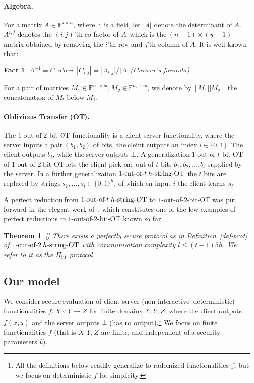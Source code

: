 \documentclass[a4paper]{article}
\newtheorem{theorem}{Theorem}[section]
\newtheorem{fact}{Fact}
\newcommand{\OT}[2]{#1\text{-out-of-}#2\text{-bit-OT}}
\newcommand{\sOT}[3]{#1\text{-out-of-}#2\text{\;$#3$-string-OT}}
\newcommand{\F}{\mathbb{F}}
\newcommand{\INT}{\Pi_{\text{int}}}
\begin{document}
\paragraph{Algebra.}

For a matrix $A\in \F^{n\times n}$, where $\F$ is a field, let
$|A|$ denote the determinant of $A$. $A^{i,j}$ denotes the $(i,j)$'th co factor of $A$, which is the $(n-1)\times(n-1)$ matrix obtained by removing the $i$'th row and $j$'th column of $A$.
It is well known that:
\begin{fact}\label{fact-cramer}
	$A^{-1}=C$ where $|C_{i,j}|=|A_{i,j}|/|A|$
	(Cramer's formula).
\end{fact}
For a pair of matrices $M_1\in \F^{n_1\times m},M_2\in \F^{n_2\times m}$, we denote by $[M_1||M_2]$ the concatenation of $M_2$ below $M_1$.

\paragraph{Oblivious Transfer (OT).}


The $\OT{1}{2}$ functionality is a client-server functionality, where the server inputs a pair $(b_1,b_2)$ of bits, the cleint outputs an index $i\in\{0,1\}$. The client outputs $b_i$, while the server outputs $\bot$.
A generalization $\OT{1}{t}$ of $\OT{1}{2}$ lets the client pick one out of $t$ bits $b_1,b_2,\ldots,b_t$ supplied by the server.
In a further generalization $\sOT{1}{t}{h}$ the $t$ bits are replaced by strings $s_1,\ldots,s_t\in \{0,1\}^h$, of which on input $i$ the client learns $s_i$.


A perfect reduction from $\sOT{1}{t}{h}$ to $\OT{1}{2}$ was put forward in the elegant work of~\cite{BCS96}, which constitutes one of the few examples of perfect reductions to $\OT{1}{2}$ known so far.

\begin{theorem}\label{thm-int}[\cite{BCS96}]
	There exists a perfectly secure protocol as in Definition~\ref{def-prot} of $\sOT{1}{2}{h}$ with communication complexity $l\leq (t-1)5h$. We refer to it as the $\INT$ protocol. 	
\end{theorem}

\subsection{Our model}
We consider secure evaluation of client-server (non interactive, deterministic) functionalities $f:X\times Y\rightarrow Z$ for finite domains $X,Y,Z$, where the client outputs $f(x,y)$ and the server outputs $\bot$ (has no output).\footnote{All the definitions below readily generalize to radomized functionalities $f$, but we focus on deterministic $f$ for simplicity.} 
We focus on finite functionalities $f$ (that is $X,Y,Z$ are finite, and independent of a security parameters $k$).
\end{document}
